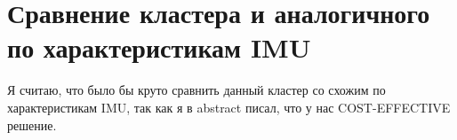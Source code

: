 \section {Сравнение кластера и аналогичного по характеристикам IMU}
Я считаю, что было бы круто сравнить данный кластер со схожим по характеристикам IMU, так как я в abstract писал, что у нас COST-EFFECTIVE решение.
